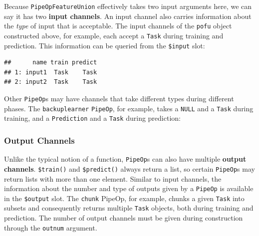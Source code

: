 \documentclass[
]{scrbook}
\newenvironment{Shaded}{\begin{snugshade}}{\end{snugshade}}
\newcommand{\AlertTok}[1]{\textcolor[rgb]{0.94,0.16,0.16}{#1}}
\newcommand{\DocumentationTok}[1]{\textcolor[rgb]{0.56,0.35,0.01}{\textbf{\textit{#1}}}}
\newcommand{\NormalTok}[1]{#1}
\newcommand{\SpecialCharTok}[1]{\textcolor[rgb]{0.00,0.00,0.00}{#1}}
\renewenvironment{Shaded} {\begin{snugshade}\small} {\end{snugshade}}
\begin{document}
Because \texttt{PipeOpFeatureUnion} effectively takes two input arguments here, we can say it has two \textbf{input channels}.
An input channel also carries information about the \emph{type} of input that is acceptable.
The input channels of the \texttt{pofu} object constructed above, for example, each accept a \texttt{Task} during training and prediction.
This information can be queried from the \texttt{\$input} slot:

\begin{Shaded}
\end{Shaded}

\begin{verbatim}
##      name train predict
## 1: input1  Task    Task
## 2: input2  Task    Task
\end{verbatim}

Other \texttt{PipeOp}s may have channels that take different types during different phases.
The \texttt{backuplearner} \texttt{PipeOp}, for example, takes a \texttt{NULL} and a \texttt{Task} during training, and a \texttt{Prediction} and a \texttt{Task} during prediction:

\begin{Shaded}
\end{Shaded}

\hypertarget{output-channels}{%
\subsubsection{Output Channels}\label{output-channels}}

Unlike the typical notion of a function, \texttt{PipeOp}s can also have multiple \textbf{output channels}.
\texttt{\$train()} and \texttt{\$predict()} always return a list, so certain \texttt{PipeOp}s may return lists with more than one element.
Similar to input channels, the information about the number and type of outputs given by a \texttt{PipeOp} is available in the \texttt{\$output} slot.
The \texttt{chunk} PipeOp, for example, chunks a given \texttt{Task} into subsets and consequently returns multiple \texttt{Task} objects, both during training and prediction.
The number of output channels must be given during construction through the \texttt{outnum} argument.
\end{document}
